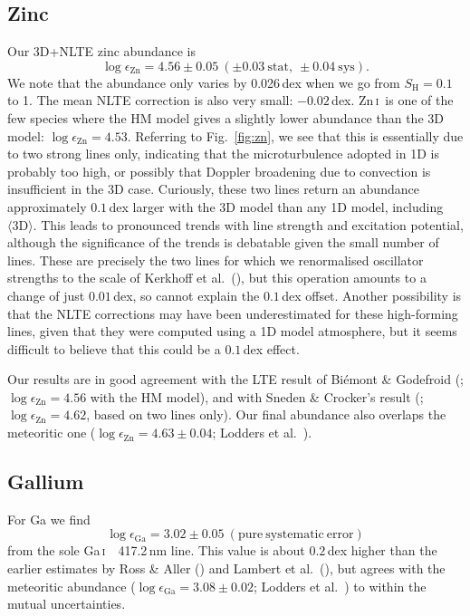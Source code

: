 \documentclass[traditabstract]{aa}
\newcommand{\oneDAV}{$\langle\mathrm{3D}\rangle$}
\newcommand{\altzni}{Zn\,\textsc{i}}
\newcommand{\altgai}{Ga\,\textsc{i}}
\newcommand{\zni}{\altzni\ }
\newcommand{\gai}{\altgai\ }
\begin{document}
\subsection{Zinc}
Our 3D+NLTE zinc abundance is 
\begin{displaymath}
\log \epsilon_{\mathrm{Zn}}=4.56\pm0.05\ (\pm0.03\ \mathrm{stat},\ \pm0.04\ \mathrm{sys}). 
\end{displaymath}
We note that the abundance only varies by 0.026\,dex when we go from $S_\mathrm{H}=0.1$ to 1. The mean NLTE correction is also very small: $-0.02$\,dex. \zni is one of the few species where the HM model gives a slightly lower abundance than the 3D model: $\log \epsilon_{\mathrm{Zn}}=4.53$.  Referring to Fig.~\ref{fig:zn}, we see that this is essentially due to two strong lines only, indicating that the microturbulence adopted in 1D is probably too high, or possibly that Doppler broadening due to convection is insufficient in the 3D case.  Curiously, these two lines return an abundance approximately $0.1$\,dex larger with the 3D model than any 1D model, including \oneDAV.  This leads to pronounced trends with line strength and excitation potential, although the significance of the trends is debatable given the small number of lines.  These are precisely the two lines for which we renormalised oscillator strengths to the scale of Kerkhoff et al.\ (\cite{Kerkhoff80}), but this operation amounts to a change of just $0.01$\,dex, so cannot explain the $0.1$\,dex offset. Another possibility is that the NLTE corrections may have been underestimated for these high-forming lines, given that they were computed using a 1D model atmosphere, but it seems difficult to believe that this could be a $0.1$\,dex effect.

Our results are in good agreement with the LTE result of Bi\'{e}mont \& Godefroid (\cite{biem}; $\log \epsilon_{\mathrm{Zn}}=4.56$ with the HM model), and with Sneden \& Crocker's result (\cite{sned2}; $\log\epsilon_{\mathrm{Zn}}=4.62$, based on two lines only).  Our final abundance also overlaps the meteoritic one ($\log \epsilon_{\mathrm{Zn}}=4.63\pm0.04$; Lodders et al.\ \cite{lodd}).

\subsection{Gallium}
For Ga we find 
\begin{displaymath}
\log\epsilon_{\mathrm{Ga}}=3.02\pm0.05\ \mathrm{(pure\ systematic\ error)}
\end{displaymath}
from the sole \gai\ 417.2\,nm line.
This value is about $0.2$\,dex higher than the earlier estimates by Ross \& Aller (\cite{ross}) and Lambert et al.\ (\cite{lamb}), but agrees with the meteoritic abundance ($\log\epsilon_{\mathrm{Ga}}=3.08\pm0.02$; Lodders et al.\ \cite{lodd}) to within the mutual uncertainties.
\end{document}
